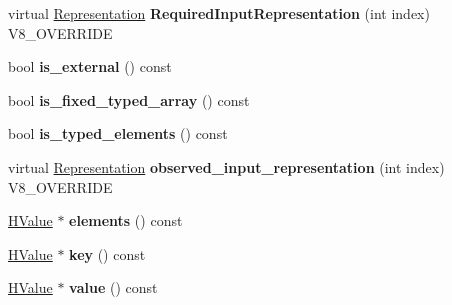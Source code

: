 \begin{DoxyCompactItemize}
\item 
\hypertarget{classv8_1_1internal_1_1_v8___f_i_n_a_l_a6c6d1f37f40b113d8f4062f1ffff7215}{}virtual \hyperlink{classv8_1_1internal_1_1_representation}{Representation} {\bfseries Required\+Input\+Representation} (int index) V8\+\_\+\+O\+V\+E\+R\+R\+I\+D\+E\label{classv8_1_1internal_1_1_v8___f_i_n_a_l_a6c6d1f37f40b113d8f4062f1ffff7215}

\item 
\hypertarget{classv8_1_1internal_1_1_v8___f_i_n_a_l_a9f31542108be0661ee66c965fbd76110}{}bool {\bfseries is\+\_\+external} () const \label{classv8_1_1internal_1_1_v8___f_i_n_a_l_a9f31542108be0661ee66c965fbd76110}

\item 
\hypertarget{classv8_1_1internal_1_1_v8___f_i_n_a_l_ab3329241dbd5a19616fb0a0346af317d}{}bool {\bfseries is\+\_\+fixed\+\_\+typed\+\_\+array} () const \label{classv8_1_1internal_1_1_v8___f_i_n_a_l_ab3329241dbd5a19616fb0a0346af317d}

\item 
\hypertarget{classv8_1_1internal_1_1_v8___f_i_n_a_l_a558e6bb397abd3937d39e3941acd7ea9}{}bool {\bfseries is\+\_\+typed\+\_\+elements} () const \label{classv8_1_1internal_1_1_v8___f_i_n_a_l_a558e6bb397abd3937d39e3941acd7ea9}

\item 
\hypertarget{classv8_1_1internal_1_1_v8___f_i_n_a_l_a0ae00f2f3ee0cfa82cd7f5d92e2db4b4}{}virtual \hyperlink{classv8_1_1internal_1_1_representation}{Representation} {\bfseries observed\+\_\+input\+\_\+representation} (int index) V8\+\_\+\+O\+V\+E\+R\+R\+I\+D\+E\label{classv8_1_1internal_1_1_v8___f_i_n_a_l_a0ae00f2f3ee0cfa82cd7f5d92e2db4b4}

\item 
\hypertarget{classv8_1_1internal_1_1_v8___f_i_n_a_l_a91287e8759f25c1fd30e3bc43b1d0582}{}\hyperlink{classv8_1_1internal_1_1_h_value}{H\+Value} $\ast$ {\bfseries elements} () const \label{classv8_1_1internal_1_1_v8___f_i_n_a_l_a91287e8759f25c1fd30e3bc43b1d0582}

\item 
\hypertarget{classv8_1_1internal_1_1_v8___f_i_n_a_l_aecac5f6b59aaff1b8ba60417c772e136}{}\hyperlink{classv8_1_1internal_1_1_h_value}{H\+Value} $\ast$ {\bfseries key} () const \label{classv8_1_1internal_1_1_v8___f_i_n_a_l_aecac5f6b59aaff1b8ba60417c772e136}

\item 
\hypertarget{classv8_1_1internal_1_1_v8___f_i_n_a_l_a998b3feae0e84bbe080297551603911f}{}\hyperlink{classv8_1_1internal_1_1_h_value}{H\+Value} $\ast$ {\bfseries value} () const \label{classv8_1_1internal_1_1_v8___f_i_n_a_l_a998b3feae0e84bbe080297551603911f}


\end{DoxyCompactItemize}
